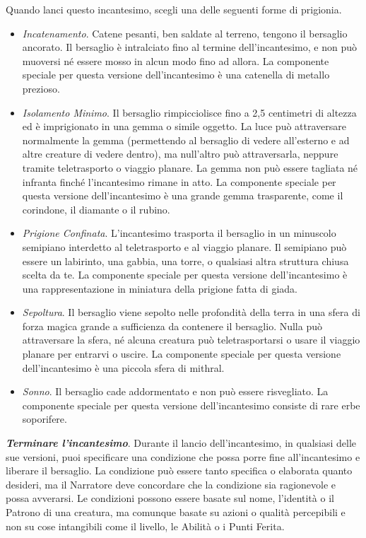 \begin{multicols}{2}
Quando lanci questo incantesimo, scegli una delle seguenti forme di prigionia.

\begin{itemize}[leftmargin=*] \setlength{\itemsep}{0pt}
	\item \emph{Incatenamento}. Catene pesanti, ben saldate al terreno, tengono il bersaglio ancorato. Il bersaglio è intralciato fino al termine dell'incantesimo, e non può muoversi né essere mosso in alcun modo fino ad allora. La componente speciale per questa versione dell'incantesimo è una catenella di metallo prezioso.
	\item \emph{Isolamento Minimo}. Il bersaglio rimpicciolisce fino a 2,5 centimetri di altezza ed è imprigionato in una gemma o simile oggetto. La luce può attraversare normalmente la gemma (permettendo al bersaglio di vedere all'esterno e ad altre creature di vedere dentro), ma null'altro può attraversarla, neppure tramite teletrasporto o viaggio planare. La gemma non può essere tagliata né infranta finché l'incantesimo rimane in atto. La componente speciale per questa versione dell'incantesimo è una grande gemma trasparente, come il corindone, il diamante o il rubino.
	\item \emph{Prigione Confinata}. L'incantesimo trasporta il bersaglio in un minuscolo semipiano interdetto al teletrasporto e al viaggio planare. Il semipiano può essere un labirinto, una gabbia, una torre, o qualsiasi altra struttura chiusa scelta da te. La componente speciale per questa versione dell'incantesimo è una rappresentazione in miniatura della prigione fatta di giada.
	\item \emph{Sepoltura}. Il bersaglio viene sepolto nelle profondità della terra in una sfera di forza magica grande a sufficienza da contenere il bersaglio. Nulla può attraversare la sfera, né alcuna creatura può teletrasportarsi o usare il viaggio planare per entrarvi o uscire. La componente speciale per questa versione dell'incantesimo è una piccola sfera di mithral.
	\item \emph{Sonno}. Il bersaglio cade addormentato e non può essere risvegliato. La componente speciale per questa versione dell'incantesimo consiste di rare erbe soporifere.
\end{itemize}

\emph{\textbf{Terminare l'incantesimo}}. Durante il lancio dell'incantesimo, in qualsiasi delle sue versioni, puoi specificare una condizione che possa porre fine all'incantesimo e liberare il bersaglio. La condizione può essere tanto specifica o elaborata quanto desideri, ma il Narratore deve concordare che la condizione sia ragionevole e possa avverarsi. Le condizioni possono essere basate sul nome, l'identità o il Patrono di una creatura, ma comunque basate su azioni o qualità percepibili e non su cose intangibili come il livello, le Abilità o i Punti Ferita.


\end{multicols}

